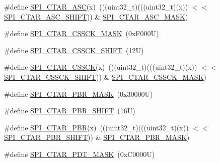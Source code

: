 \begin{DoxyCompactItemize}
\item 
\#define \mbox{\hyperlink{group___s_p_i___register___masks_ga2cd43b6b9241829083a88d903cc1ca2a}{S\+P\+I\+\_\+\+C\+T\+A\+R\+\_\+\+A\+SC}}(x)~(((uint32\+\_\+t)(((uint32\+\_\+t)(x)) $<$$<$ \mbox{\hyperlink{group___s_p_i___register___masks_gadbf91ef3bf1d4943ab782ff027d121bd}{S\+P\+I\+\_\+\+C\+T\+A\+R\+\_\+\+A\+S\+C\+\_\+\+S\+H\+I\+FT}})) \& \mbox{\hyperlink{group___s_p_i___register___masks_gad15c92f5474cc1ba1ca2af14c92cbf26}{S\+P\+I\+\_\+\+C\+T\+A\+R\+\_\+\+A\+S\+C\+\_\+\+M\+A\+SK}})
\item 
\#define \mbox{\hyperlink{group___s_p_i___register___masks_ga5c824276fa48ae7b05fc922d20d237c0}{S\+P\+I\+\_\+\+C\+T\+A\+R\+\_\+\+C\+S\+S\+C\+K\+\_\+\+M\+A\+SK}}~(0x\+F000\+U)
\item 
\#define \mbox{\hyperlink{group___s_p_i___register___masks_gaf4e35373d2e9149e1c73f9b65887ad37}{S\+P\+I\+\_\+\+C\+T\+A\+R\+\_\+\+C\+S\+S\+C\+K\+\_\+\+S\+H\+I\+FT}}~(12\+U)
\item 
\#define \mbox{\hyperlink{group___s_p_i___register___masks_ga3c988f51f8a9ffc42af2b1c780796666}{S\+P\+I\+\_\+\+C\+T\+A\+R\+\_\+\+C\+S\+S\+CK}}(x)~(((uint32\+\_\+t)(((uint32\+\_\+t)(x)) $<$$<$ \mbox{\hyperlink{group___s_p_i___register___masks_gaf4e35373d2e9149e1c73f9b65887ad37}{S\+P\+I\+\_\+\+C\+T\+A\+R\+\_\+\+C\+S\+S\+C\+K\+\_\+\+S\+H\+I\+FT}})) \& \mbox{\hyperlink{group___s_p_i___register___masks_ga5c824276fa48ae7b05fc922d20d237c0}{S\+P\+I\+\_\+\+C\+T\+A\+R\+\_\+\+C\+S\+S\+C\+K\+\_\+\+M\+A\+SK}})
\item 
\#define \mbox{\hyperlink{group___s_p_i___register___masks_ga4f40ea2ab0d14559523ab0699fd682c6}{S\+P\+I\+\_\+\+C\+T\+A\+R\+\_\+\+P\+B\+R\+\_\+\+M\+A\+SK}}~(0x30000\+U)
\item 
\#define \mbox{\hyperlink{group___s_p_i___register___masks_gaf53f764d59da1c7a68c9185a71dfec66}{S\+P\+I\+\_\+\+C\+T\+A\+R\+\_\+\+P\+B\+R\+\_\+\+S\+H\+I\+FT}}~(16\+U)
\item 
\#define \mbox{\hyperlink{group___s_p_i___register___masks_ga32e4047abbaf3dcf3d1cb2ab30142442}{S\+P\+I\+\_\+\+C\+T\+A\+R\+\_\+\+P\+BR}}(x)~(((uint32\+\_\+t)(((uint32\+\_\+t)(x)) $<$$<$ \mbox{\hyperlink{group___s_p_i___register___masks_gaf53f764d59da1c7a68c9185a71dfec66}{S\+P\+I\+\_\+\+C\+T\+A\+R\+\_\+\+P\+B\+R\+\_\+\+S\+H\+I\+FT}})) \& \mbox{\hyperlink{group___s_p_i___register___masks_ga4f40ea2ab0d14559523ab0699fd682c6}{S\+P\+I\+\_\+\+C\+T\+A\+R\+\_\+\+P\+B\+R\+\_\+\+M\+A\+SK}})
\item 
\#define \mbox{\hyperlink{group___s_p_i___register___masks_ga3680f8dc0308705f06e234914edfa14b}{S\+P\+I\+\_\+\+C\+T\+A\+R\+\_\+\+P\+D\+T\+\_\+\+M\+A\+SK}}~(0x\+C0000\+U)
$$
\end{DoxyCompactItemize}
